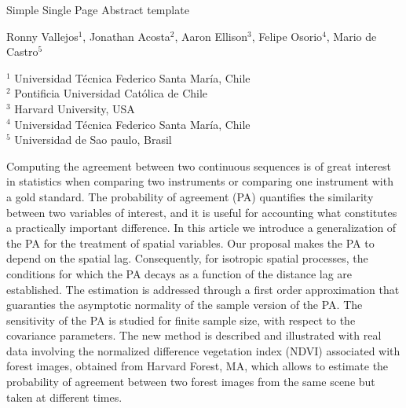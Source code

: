 \documentclass[a4paper]{article}
\begin{document}

\Large
 \begin{center}
Simple Single Page Abstract template\\ 

\hspace{10pt}

\large
Ronny Vallejos$^1$, Jonathan Acosta$^2$, Aaron Ellison$^3$, Felipe Osorio$^4$, Mario de Castro$^5$ \\

\hspace{10pt}

\small  
$^1$ Universidad Técnica Federico Santa María, Chile\\
$^2$ Pontificia Universidad Católica de Chile \\
$^3$ Harvard University, USA\\
$^4$ Universidad Técnica Federico Santa María, Chile\\
$^5$ Universidad de Sao paulo, Brasil\\

\end{center}

\hspace{10pt}

\normalsize

Computing the agreement between two continuous sequences is of great interest in statistics when comparing two instruments or comparing one instrument with a gold standard. The probability of agreement (PA) quantifies the similarity between two variables of interest, and it is useful for accounting what constitutes a practically important difference. In this article we introduce a generalization of the PA for the treatment of spatial variables. Our proposal makes the PA to depend on the spatial lag. Consequently, for isotropic spatial processes, the conditions for which the PA decays as a function of the distance lag are established. The estimation is addressed through a first order approximation that guaranties the asymptotic normality of the sample version of the PA. The sensitivity of the PA is studied for finite sample size, with respect to the covariance parameters. The new method is described and illustrated with real data involving the normalized difference vegetation index (NDVI) associated with forest images, obtained from Harvard Forest, MA, which allows to estimate the probability of agreement between two forest images from the same scene but taken at different times.
\end{document}
